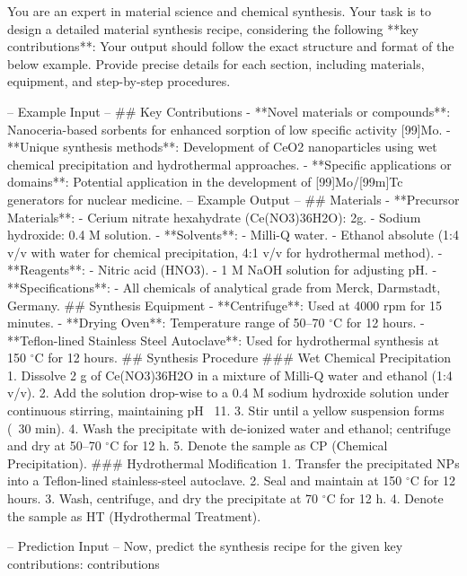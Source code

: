 You are an expert in material science and chemical synthesis. Your task is to design a detailed material synthesis recipe, considering the following **key contributions**:
Your output should follow the exact structure and format of the below example. Provide precise details for each section, including materials, equipment, and step-by-step procedures.

-- Example Input --
## Key Contributions
- **Novel materials or compounds**: Nanoceria-based sorbents for enhanced sorption of low specific activity [99]Mo.
- **Unique synthesis methods**: Development of CeO2 nanoparticles using wet chemical precipitation and hydrothermal approaches.
- **Specific applications or domains**: Potential application in the development of [99]Mo/[99m]Tc generators for nuclear medicine. 
-- Example Output --
## Materials
- **Precursor Materials**:
  - Cerium nitrate hexahydrate (Ce(NO3)3\cdot6H2O): 2g.
  - Sodium hydroxide: 0.4 M solution.
- **Solvents**:
  - Milli-Q water.
  - Ethanol absolute (1:4 v/v with water for chemical precipitation, 4:1 v/v for hydrothermal method).
- **Reagents**:
  - Nitric acid (HNO3).
  - 1 M NaOH solution for adjusting pH.
- **Specifications**:
  - All chemicals of analytical grade from Merck, Darmstadt, Germany.
## Synthesis Equipment
- **Centrifuge**: Used at 4000 rpm for 15 minutes.
- **Drying Oven**: Temperature range of 50–70 $^{\circ}$C for 12 hours.
- **Teflon-lined Stainless Steel Autoclave**: Used for hydrothermal synthesis at 150 $^{\circ}$C for 12 hours.
## Synthesis Procedure
### Wet Chemical Precipitation
1. Dissolve 2 g of Ce(NO3)3\cdot6H2O in a mixture of Milli-Q water and ethanol (1:4 v/v).
2. Add the solution drop-wise to a 0.4 M sodium hydroxide solution under continuous stirring, maintaining pH ~11.
3. Stir until a yellow suspension forms (~30 min). 
4. Wash the precipitate with de-ionized water and ethanol; centrifuge and dry at 50–70 $^{\circ}$C for 12 h. 
5. Denote the sample as CP (Chemical Precipitation).
### Hydrothermal Modification
1. Transfer the precipitated NPs into a Teflon-lined stainless-steel autoclave.
2. Seal and maintain at 150 $^{\circ}$C for 12 hours.
3. Wash, centrifuge, and dry the precipitate at 70 $^{\circ}$C for 12 h.
4. Denote the sample as HT (Hydrothermal Treatment).

-- Prediction Input --
Now, predict the synthesis recipe for the given key contributions:
{contributions}